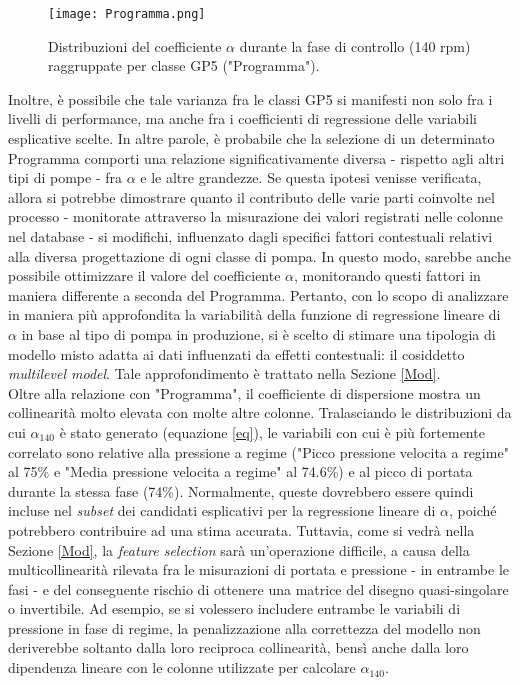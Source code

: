 \documentclass[fleqn,10pt]{SelfArx} %
\begin{document}
\begin{figure}[h]
    \centering
    \texttt{[image: Programma.png]}
    \label{fig:em}
    \caption{Distribuzioni del coefficiente $\alpha$ durante la fase di controllo (140 rpm) raggruppate per classe GP5 ("Programma").}
\end{figure}
Inoltre, è possibile che tale varianza fra le classi GP5 si manifesti non solo fra i livelli di performance, ma anche fra i coefficienti di regressione delle variabili esplicative scelte. In altre parole, è probabile che la selezione di un determinato Programma comporti una relazione significativamente diversa - rispetto agli altri tipi di pompe - fra $\alpha$ e le altre grandezze. Se questa ipotesi venisse verificata, allora si potrebbe dimostrare quanto il contributo delle varie parti coinvolte nel processo - monitorate attraverso la misurazione dei valori registrati nelle colonne nel database - si modifichi, influenzato dagli specifici fattori contestuali relativi alla diversa progettazione di ogni classe di pompa. In questo modo, sarebbe anche possibile ottimizzare il valore del coefficiente $\alpha$, monitorando questi fattori in maniera differente a seconda del Programma. Pertanto, con lo scopo di analizzare in maniera più approfondita la variabilità della funzione di regressione lineare di $\alpha$ in base al tipo di pompa in produzione, si è scelto di stimare una tipologia di modello misto adatta ai dati influenzati da effetti contestuali: il cosiddetto \textit{multilevel model}. Tale approfondimento è trattato nella Sezione \ref{Mod}.\\
Oltre alla relazione con "Programma", il coefficiente di dispersione mostra un collinearità molto elevata con molte altre colonne. Tralasciando le distribuzioni da cui $\alpha_{140}$ è stato generato (equazione \ref{eq}), le variabili con cui è più fortemente correlato sono relative alla pressione a regime ("Picco pressione velocita a regime" al 75\% e "Media pressione velocita a regime" al 74.6\%) e al picco di portata durante la stessa fase (74\%). Normalmente, queste dovrebbero essere quindi incluse nel \textit{subset} dei candidati esplicativi per la regressione lineare di $\alpha$, poiché potrebbero contribuire ad una stima accurata. Tuttavia, come si vedrà nella Sezione \ref{Mod}, la \textit{feature selection} sarà un'operazione difficile, a causa della multicollinearità rilevata fra le misurazioni di portata e pressione - in entrambe le fasi - e del conseguente rischio di ottenere una matrice del disegno quasi-singolare o invertibile. Ad esempio, se si volessero includere entrambe le variabili di pressione in fase di regime, la penalizzazione alla correttezza del modello non deriverebbe soltanto dalla loro reciproca collinearità, bensì anche dalla loro dipendenza lineare con le colonne utilizzate per calcolare $\alpha_{140}$.\\
\end{document}
